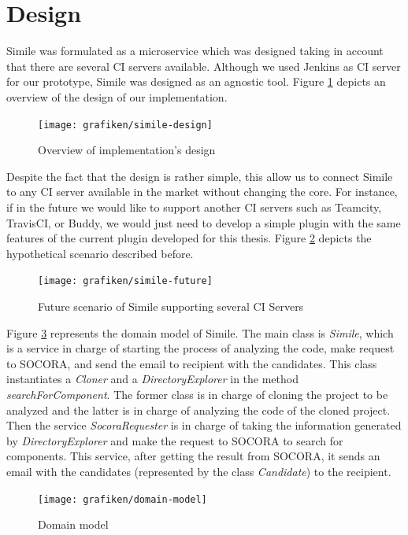 \section{Design}
Simile was formulated as a microservice which was designed taking in account that there are several CI servers available. Although we used Jenkins as CI server for our prototype, Simile was designed as an agnostic tool. Figure \ref{fig:simile-design} depicts an overview of the design of our implementation.

\begin{figure}[H]
	\centering
    \texttt{[image: grafiken/simile-design]}
    \caption{Overview of implementation's design}
    \label{fig:simile-design}
\end{figure}

Despite the fact that the design is rather simple, this allow us to connect Simile to any CI server available in the market without changing the core. For instance, if in the future we would like to support another CI servers such as Teamcity, TravisCI, or Buddy, we would just need to develop a simple plugin with the same features of the current plugin developed for this thesis. Figure \ref{fig:simile-future} depicts the hypothetical scenario described before.

\begin{figure}[H]
	\centering
    \texttt{[image: grafiken/simile-future]}
    \caption{Future scenario of Simile supporting several CI Servers}
    \label{fig:simile-future}
\end{figure}

Figure \ref{fig:domain-model} represents the domain model of Simile. The main class is \emph{Simile}, which is a service in charge of starting the process of analyzing the code, make request to SOCORA, and send the email to recipient with the candidates. This class instantiates a \emph{Cloner} and a \emph{DirectoryExplorer} in the method \emph{searchForComponent}. The former class is in charge of cloning the project to be analyzed and the latter is in charge of analyzing the code of the cloned project. Then the service \emph{SocoraRequester} is in charge of taking the information generated by \emph{DirectoryExplorer} and make the request to SOCORA to search for components. This service, after getting the result from SOCORA, it sends an email with the candidates (represented by the class \emph{Candidate}) to the recipient. 

\begin{figure}[H]
	\centering
    \texttt{[image: grafiken/domain-model]}
    \caption{Domain model}
    \label{fig:domain-model}
\end{figure}

